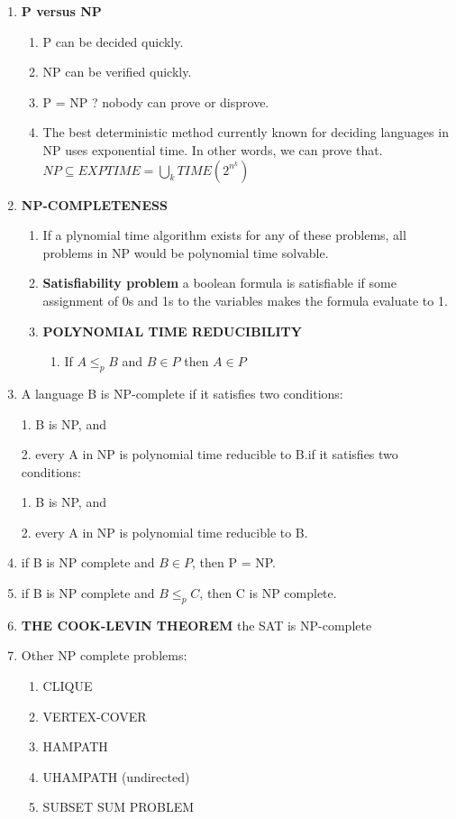 \documentclass{article}
\newcommand{\imp}[1]{\textbf{#1}}
\begin{document}
\begin{enumerate}[1., leftmargin = 0.6cm]
\begin{enumerate}[1., leftmargin = 0.6cm]
    \end{enumerate}
\item \imp{P versus NP}
    \begin{enumerate}[1., leftmargin = 0.6cm]
    \itemsep0em
    \item P can be decided quickly.
    \item NP can be verified quickly.
    \item P = NP ? nobody can prove or disprove.
    \item The best deterministic method currently known for deciding languages in NP
    uses exponential time. In other words, we can prove that.\\
        $ NP \subseteq EXPTIME = \bigcup_kTIME(2^{n^k})$
    \end{enumerate}
\item \imp{NP-COMPLETENESS}
    \begin{enumerate}[1., leftmargin = 0.6cm]
    \itemsep0em
    \item If a plynomial time algorithm exists for any of these problems, all problems
    in NP would be polynomial time solvable.
    \item \imp{Satisfiability problem} a boolean formula is satisfiable if some
    assignment of 0s and 1s to the variables makes the formula evaluate to 1.
    \item \imp{POLYNOMIAL TIME REDUCIBILITY}
        \begin{enumerate}[1., leftmargin = 0.6cm]
        \itemsep0em
        \item If $A \le_p B$ and $B\in P$ then $A \in P$
        \end{enumerate}
    \end{enumerate}
    \item A language B is NP-complete if it satisfies two conditions:

        1. B is NP, and

        2. every A in NP is polynomial time reducible to B.if it satisfies two
        conditions:

            1. B is NP, and

            2. every A in NP is polynomial time reducible to B.
    \item if B is NP complete and $B \in P$, then P = NP.
    \item if B is NP complete and $B \le_p C$, then C is NP complete.
    \item \imp{THE COOK-LEVIN THEOREM} the SAT is NP-complete
    \item Other NP complete problems:
        \begin{enumerate}[1., leftmargin = 0.6cm]
        \itemsep0em
        \item CLIQUE
        \item VERTEX-COVER
        \item HAMPATH
        \item UHAMPATH (undirected)
        \item SUBSET SUM PROBLEM


\end{enumerate}
\end{enumerate}
\end{document}
